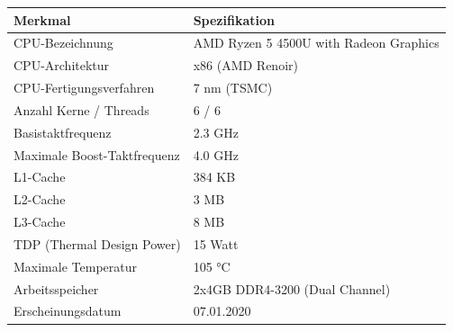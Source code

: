 \documentclass[12pt]{article}
\begin{document}
\begin{table}[h]
	\centering
	\begin{tabular}{|l|l|}
		\hline
		\textbf{Merkmal} & \textbf{Spezifikation} \\
		\hline
		CPU-Bezeichnung & AMD Ryzen 5 4500U with Radeon Graphics\\
		CPU-Architektur & x86 (AMD Renoir) \\
		CPU-Fertigungsverfahren & 7 nm (TSMC) \\
		\hline
		Anzahl Kerne / Threads & 6 / 6 \\
		Basistaktfrequenz & 2.3 GHz \\
		Maximale Boost-Taktfrequenz & 4.0 GHz \\
		\hline
		L1-Cache & 384 KB \\
		L2-Cache & 3 MB \\
		L3-Cache & 8 MB \\
		\hline
		TDP (Thermal Design Power) & 15 Watt \\
		Maximale Temperatur & 105 °C \\
		\hline
		Arbeitsspeicher & 2x4GB DDR4-3200 (Dual Channel) \\
		\hline
		Erscheinungsdatum & 07.01.2020 \\
		\hline
	\end{tabular}
\end{table}
\end{document}
